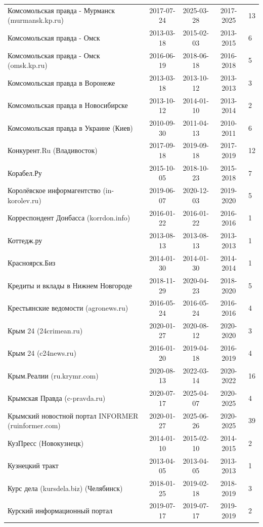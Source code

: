 \begin{longtable}{p{6cm}cccp{2cm}}
Комсомольская правда - Мурманск (murmansk.kp.ru) & 2017-07-24 & 2025-03-28 & 2017-2025 & 13\\
Комсомольская правда - Омск & 2013-03-18 & 2015-02-03 & 2013-2015 & 6\\
Комсомольская правда - Омск (omsk.kp.ru) & 2016-06-19 & 2018-06-18 & 2016-2018 & 5\\
Комсомольская правда в Воронеже & 2013-03-18 & 2013-10-12 & 2013-2013 & 3\\
Комсомольская правда в Новосибирске & 2013-10-12 & 2014-01-10 & 2013-2014 & 2\\
Комсомольская правда в Украине (Киев) & 2010-09-30 & 2011-04-13 & 2010-2011 & 6\\
Конкурент.Ru (Владивосток) & 2017-09-18 & 2019-09-18 & 2017-2019 & 12\\
Корабел.Ру & 2015-10-05 & 2018-10-23 & 2015-2018 & 7\\
Королёвское информагентство (in-korolev.ru) & 2019-06-07 & 2020-12-03 & 2019-2020 & 5\\
Корреспондент Донбасса (korrdon.info) & 2016-01-22 & 2016-01-22 & 2016-2016 & 1\\
Коттедж.ру & 2013-08-13 & 2013-08-13 & 2013-2013 & 1\\
Красноярск.Биз & 2014-01-30 & 2014-01-30 & 2014-2014 & 1\\
Кредиты и вклады в Нижнем Новгороде & 2018-11-29 & 2020-04-23 & 2018-2020 & 5\\
Крестьянские ведомости (agronews.ru) & 2016-05-24 & 2016-05-24 & 2016-2016 & 4\\
Крым 24 (24crimean.ru) & 2020-01-27 & 2020-08-12 & 2020-2020 & 3\\
Крым 24 (c24news.ru) & 2016-01-20 & 2019-04-18 & 2016-2019 & 4\\
Крым.Реалии (ru.krymr.com) & 2020-08-13 & 2022-03-14 & 2020-2022 & 16\\
Крымская Правда (c-pravda.ru) & 2020-07-17 & 2025-04-07 & 2020-2025 & 4\\
Крымский новостной портал INFORMER (ruinformer.com) & 2020-01-27 & 2025-06-26 & 2020-2025 & 39\\
КузПресс (Новокузнецк) & 2014-01-10 & 2015-02-10 & 2014-2015 & 2\\
Кузнецкий тракт & 2013-04-05 & 2013-04-05 & 2013-2013 & 1\\
Курс дела (kursdela.biz) (Челябинск) & 2018-01-25 & 2019-02-18 & 2018-2019 & 3\\
Курский информационный портал & 2019-07-17 & 2019-07-17 & 2019-2019 & 2\\

\end{longtable}

